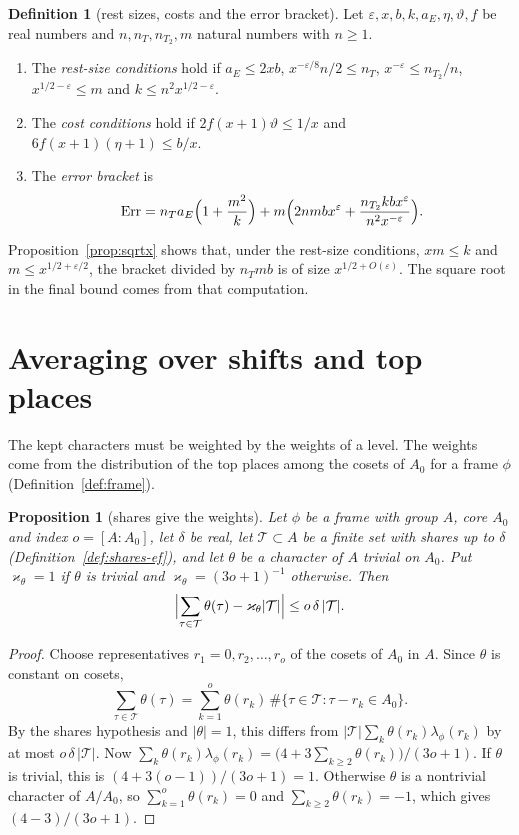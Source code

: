 \documentclass[11pt]{amsbook}
\theoremstyle{plain}
\newtheorem{proposition}[theorem]{Proposition}
\theoremstyle{definition}
\newtheorem{definition}[theorem]{Definition}
\theoremstyle{remark}
\numberwithin{equation}{section}
\numberwithin{figure}{chapter}
\numberwithin{table}{chapter}
\newcommand{\eps}{\varepsilon}
\newcommand{\Top}{\mathcal{T}}
\newcommand{\Err}{\mathrm{Err}}
\begin{document}
\begin{definition}[rest sizes, costs and the error bracket]
\label{def:restsize}
Let $\eps,x,b,k,a_E,\eta,\vartheta,f$ be real numbers and
$n,n_T,n_{T_2},m$ natural numbers with $n\ge1$.
\begin{enumerate}[label=(\arabic*)]
\item The \emph{rest-size conditions} hold if $a_E\le2xb$,
$x^{-\eps/8}n/2\le n_T$, $x^{-\eps}\le n_{T_2}/n$, $x^{1/2-\eps}\le m$
and $k\le n^2x^{1/2-\eps}$.
\item The \emph{cost conditions} hold if $2f(x+1)\vartheta\le1/x$ and
$6f(x+1)(\eta+1)\le b/x$.
\item The \emph{error bracket} is
\[
\Err=n_Ta_E\Bigl(1+\frac{m^2}{k}\Bigr)+m\Bigl(2nmbx^\eps+
\frac{n_{T_2}kbx^\eps}{n^2x^{-\eps}}\Bigr).
\]
\end{enumerate}
\end{definition}

\noindent Proposition~\ref{prop:sqrtx} shows that, under the rest-size
conditions, $xm\le k$ and $m\le x^{1/2+\eps/2}$, the bracket divided by
$n_Tmb$ is of size $x^{1/2+O(\eps)}$. The square root in the final
bound comes from that computation.

\section{Averaging over shifts and top places}

The kept characters must be weighted by the weights of a level. The
weights come from the distribution of the top places among the cosets
of $A_0$ for a frame $\phi$ (Definition~\ref{def:frame}).

\begin{proposition}[shares give the weights]\label{prop:shares}
Let $\phi$ be a frame with group $A$, core $A_0$ and index
$o=[A:A_0]$, let $\delta$ be real, let $\Top\subset A$ be a finite set
with shares up to $\delta$ (Definition~\ref{def:shares-ef}), and let
$\theta$ be a character of $A$ trivial on $A_0$. Put
$\varkappa_\theta=1$ if $\theta$ is trivial and
$\varkappa_\theta=(3o+1)^{-1}$ otherwise. Then
\[
\Bigl|\sum_{\tau\in\Top}\theta(\tau)-\varkappa_\theta|\Top|\Bigr|\le
o\,\delta\,|\Top|.
\]
\end{proposition}

\begin{proof}
Choose representatives $r_1=0,r_2,\dots,r_o$ of the cosets of $A_0$ in
$A$. Since $\theta$ is constant on cosets,
\[
\sum_{\tau\in\Top}\theta(\tau)=\sum_{k=1}^o\theta(r_k)\,
\#\{\tau\in\Top:\tau-r_k\in A_0\}.
\]
By the shares hypothesis and $|\theta|=1$, this differs from
$|\Top|\sum_k\theta(r_k)\lambda_\phi(r_k)$ by at most
$o\,\delta\,|\Top|$. Now
$\sum_k\theta(r_k)\lambda_\phi(r_k)=\bigl(4+3\sum_{k\ge2}
\theta(r_k)\bigr)/(3o+1)$. If $\theta$ is trivial, this is
$(4+3(o-1))/(3o+1)=1$. Otherwise $\theta$ is a nontrivial character of
$A/A_0$, so $\sum_{k=1}^o\theta(r_k)=0$ and
$\sum_{k\ge2}\theta(r_k)=-1$, which gives $(4-3)/(3o+1)$.
\end{proof}
\end{document}
